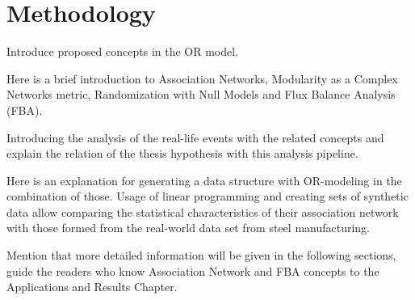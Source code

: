 \chapter{Methodology}
{\color{red} 
	Introduce proposed concepts in the OR model.
	
	Here is a brief introduction to Association Networks, Modularity as a Complex Networks metric, Randomization with Null Models and Flux Balance Analysis (FBA).
	
	Introducing the analysis of the real-life events with the related concepts and explain the relation of the thesis hypothesis with this analysis pipeline.
	
	Here is an explanation for generating a data structure with OR-modeling in the combination of those. Usage of linear programming and creating sets of synthetic data allow comparing the statistical characteristics of their association network with those formed from the real-world data set from steel manufacturing.
	
	Mention that more detailed information will be given in the following sections, guide the readers who know Association Network and FBA concepts to the Applications and Results Chapter.
	
}



